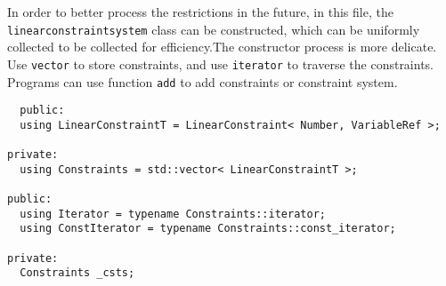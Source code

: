 \documentclass[12pt]{article}
\begin{document}
In order to better process the restrictions in the future, in this file, the \texttt {linearconstraintsystem} class can be constructed, which can be uniformly collected to be collected for efficiency.The constructor process is more delicate. Use \texttt {vector} to store constraints, and use \texttt {iterator} to traverse the constraints. Programs can use function \texttt{add} to add constraints or constraint system.

\begin{lstlisting}
  public:
  using LinearConstraintT = LinearConstraint< Number, VariableRef >;

private:
  using Constraints = std::vector< LinearConstraintT >;

public:
  using Iterator = typename Constraints::iterator;
  using ConstIterator = typename Constraints::const_iterator;

private:
  Constraints _csts;
\end{lstlisting}
\end{document}
